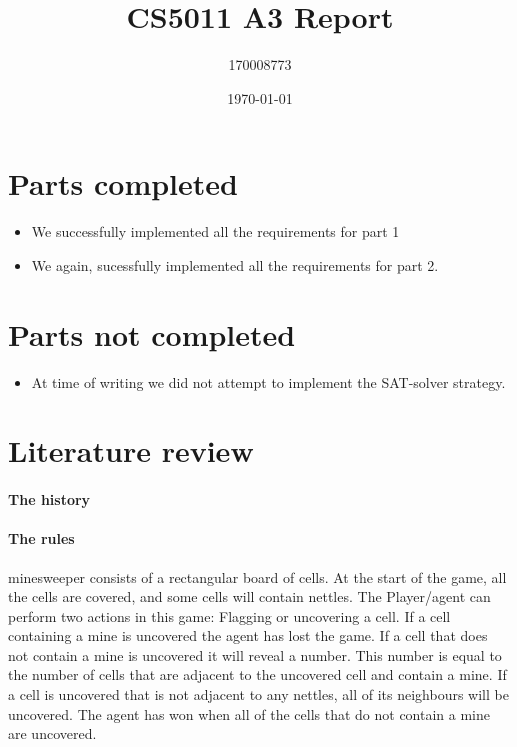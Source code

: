 \documentclass[british]{article}
\title{CS5011 A3 Report}
\author{170008773}
\date{\today}
\begin{document}
\maketitle


\section{Parts completed}
\label{completed}
\begin{itemize}
\item We successfully implemented all the requirements for part 1
\item We again, sucessfully implemented all the requirements for part 2.
\end{itemize}

\section{Parts not completed}
\label{uncompleted}
\begin{itemize}
\item At time of writing we did not attempt to implement the SAT-solver strategy.
\end{itemize}

\section{Literature review}
\label{litrev}


\paragraph{The history}

\paragraph{The rules} minesweeper consists of a rectangular board of cells. At the start of the game, all the cells are covered, and some cells will contain nettles. The Player/agent can perform two actions in this game: Flagging or uncovering a cell. If a cell containing a mine is uncovered the agent has lost the game. If a cell that does not contain a mine is uncovered it will reveal a number. This number is equal to the number of cells that are adjacent to the uncovered cell and contain a mine. If a cell is uncovered that is not adjacent to any nettles, all of its neighbours will be uncovered. The agent has won when all of the cells that do not contain a mine are uncovered. 
\end{document}
